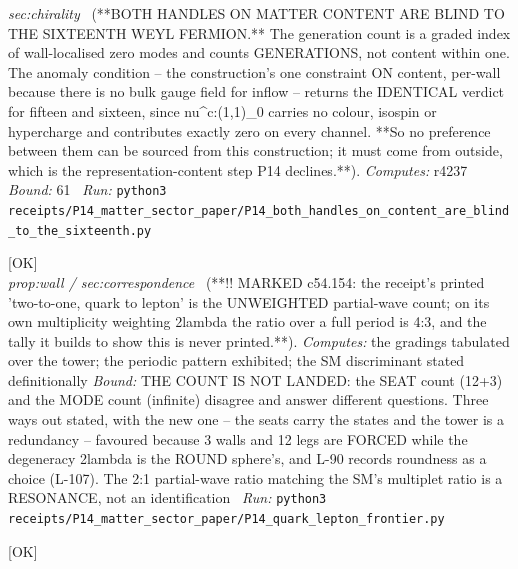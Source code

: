 \begin{description}
\textit{sec:chirality} \ (**BOTH HANDLES ON MATTER CONTENT ARE BLIND TO THE SIXTEENTH WEYL FERMION.** The generation count is a graded index of wall-localised zero modes and counts GENERATIONS, not content within one. The anomaly condition -- the construction's one constraint ON content, per-wall because there is no bulk gauge field for inflow -- returns the IDENTICAL verdict for fifteen and sixteen, since nu\textasciicircum{}c:(1,1)\_0 carries no colour, isospin or hypercharge and contributes exactly zero on every channel. **So no preference between them can be sourced from this construction; it must come from outside, which is the representation-content step P14 declines.**). 
\emph{Computes:} r4237
 \emph{Bound:} 61
\ \emph{Run:} \texttt{python3 receipts/P14\_matter\_sector\_paper/P14\_both\_handles\_on\_content\_are\_blind\_to\_the\_sixteenth.py}
\item[\rcptlabel{P14_quark_lepton_frontier}{P14R20}\textbf{P14R20}\quad\texttt{P14\_quark\_lepton\_frontier}]\hfill\textsf{[OK]}\\
\textit{prop:wall / sec:correspondence} \ (**!! MARKED c54.154: the receipt's printed 'two-to-one, quark to lepton' is the UNWEIGHTED partial-wave count; on its own multiplicity weighting 2\textbar{}lambda\textbar{} the ratio over a full period is 4:3, and the tally it builds to show this is never printed.**). 
\emph{Computes:} the gradings tabulated over the tower; the periodic pattern exhibited; the SM discriminant stated definitionally
 \emph{Bound:} THE COUNT IS NOT LANDED: the SEAT count (12+3) and the MODE count (infinite) disagree and answer different questions. Three ways out stated, with the new one -- the seats carry the states and the tower is a redundancy -- favoured because 3 walls and 12 legs are FORCED while the degeneracy 2\textbar{}lambda\textbar{} is the ROUND sphere's, and L-90 records roundness as a choice (L-107). The 2:1 partial-wave ratio matching the SM's multiplet ratio is a RESONANCE, not an identification
\ \emph{Run:} \texttt{python3 receipts/P14\_matter\_sector\_paper/P14\_quark\_lepton\_frontier.py}
\item[\rcptlabel{P14_the_count_specified}{P14R21}\textbf{P14R21}\quad\texttt{P14\_the\_count\_specified}]\hfill\textsf{[OK]}\\

\end{description}
